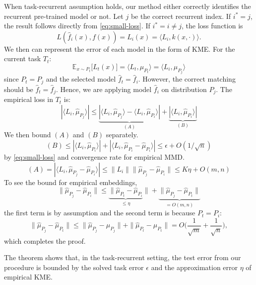 \documentclass[paper=letter, fontsize=20pt]{article}
\begin{document}
\begin{spacelessprf}
When task-recurrent assumption holds, our method either correctly identifies the recurrent pre-trained model or not. Let $j$ be the correct recurrent index. If $i^{\ast} = j$,  the result follows directly from \eqref{eq:small-loss}. If $i^{\ast} = i \neq j$, the loss function is
$$
L(\widehat{f}_i(x), f(x)) = L_i(x) = \langle L_i, k(x,\cdot) \rangle.
$$
We then can represent the error of each model in the form of KME. For the current task $T_t$:
$$\mathds{E}_{x\sim P_t } \big[L_t(x)\big] = \langle L_t, \mu_{P_t}\rangle = \langle L_i, \mu_{P_j}\rangle $$
since $P_t = P_j$ and the selected model $\widehat{f}_t = \widehat{f}_i$. However, the correct matching should be $\widehat{f}_t = \widehat{f}_j$. Hence, we are applying model $\widehat{f}_i$ on distribution $P_j$. The empirical loss in $T_t$ is:
$$
|\langle L_i, \widehat{\mu}_{P_j}\rangle| \leq 
\underbrace{|\langle L_i, \widehat{\mu}_{P_j}\rangle - \langle L_i, \widehat{\mu}_{P_i}\rangle|}_{(A)} + \underbrace{|\langle L_i, \widehat{\mu}_{P_i}\rangle|}_{(B)}
$$
We then bound $(A)$ and $(B)$ separately. 
$$(B)\leq |\langle L_i, \widehat{\mu}_{P_i}\rangle|+ |\langle L_i, \widehat{\mu}_{P_i} - \widehat{\mu}_{P_i}\rangle|\leq \epsilon + O(1/\sqrt{n})$$ 
by \eqref{eq:small-loss} and convergence rate for empirical \textnormal{MMD}. 
$$(A) = |\langle L_i, \widehat{\mu}_{P_j} - \widehat{\mu}_{P_i}\rangle| \leq \|L_i\|\|\widehat{\mu}_{P_j} - \widehat{\mu}_{P_i} \|\leq K \eta + O(m,n)$$
To see the bound for empirical embeddings, $$\|\widehat{\mu}_{P_j} - \widehat{\mu}_{P_i} \| \leq  \underbrace{\|\widehat{\mu}_{P_t} - \widehat{\mu}_{P_i}}_{\leq \eta} \| + \underbrace{\|\widehat{\mu}_{P_j} - \widehat{\mu}_{P_t} \| }_{=O(m,n)}$$
the first term is by assumption and the second term is because $P_t=P_i$:
\begin{equation*}
\|\widehat{\mu}_{P_j} - \widehat{\mu}_{P_t}\| \leq\|\widehat{\mu}_{P_j} - \mu_{P_j} \|+\|\widehat{\mu}_{P_t} - \mu_{P_t} \| = O\Big(\frac{1}{\sqrt{m}}+\frac{1}{\sqrt{n}}\Big),
\end{equation*}
which completes the proof.
\end{spacelessprf}
The theorem shows that, in the task-recurrent setting, the test error from our procedure is bounded by the solved task error $\epsilon$ and the approximation error $\eta$ of empirical KME. 
\end{document}
